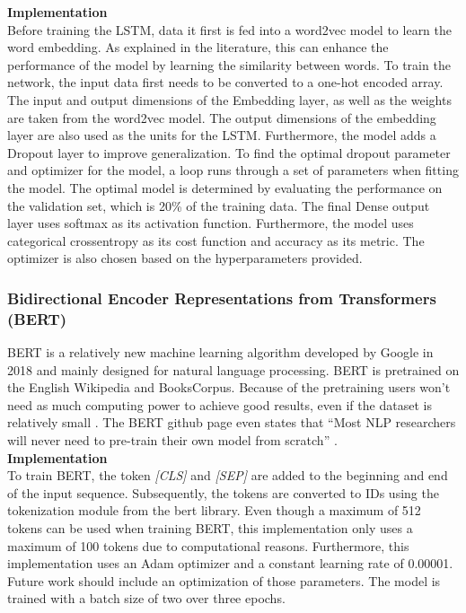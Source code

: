 \documentclass[11pt, a4paper]{article}
\begin{document}
\noindent\textbf{Implementation}\\
Before training the LSTM, data it first is fed into a word2vec model to learn the word embedding. As explained in the literature, this can enhance the performance of the model by learning the similarity between words.
To train the network, the input data first needs to be converted to a one-hot encoded array. The input and output dimensions of the Embedding layer, as well as the weights are taken from the word2vec model.
The output dimensions of the embedding layer are also used as the units for the LSTM. Furthermore, the model adds a Dropout layer to improve generalization. To find the optimal dropout parameter and optimizer for the model,
a loop runs through a set of parameters when fitting the model. The optimal model is determined by evaluating the performance on the validation set, which is 20\% of the training data. 
The final Dense output layer uses softmax as its activation function. Furthermore, the model uses categorical crossentropy as its cost function and accuracy as its metric. The optimizer is also chosen based on the hyperparameters provided.


\subsubsection{Bidirectional Encoder Representations from Transformers (BERT)} \label{subs:bert}
BERT is a relatively new machine learning algorithm developed by Google in 2018 and mainly designed for 
natural language processing. BERT is pretrained on the English Wikipedia and BooksCorpus. Because of the 
pretraining users won’t need as much computing power to achieve good results, even if the dataset is relatively 
small \citep{devlin2019bert}. The BERT github page even states that 
“Most NLP researchers will never need to pre-train their own model from scratch” \citep{googlegithub}.\\

\noindent\textbf{Implementation}\\
To train BERT, the token \emph{[CLS]} and \emph{[SEP]} are added to the beginning and end of the input sequence. Subsequently, the tokens are converted to IDs using the tokenization
module from the bert library. Even though a maximum of 512 tokens can be used when training BERT, this implementation only uses a maximum of 100 tokens due to computational reasons.
Furthermore, this implementation uses an Adam optimizer and a constant learning rate of 0.00001. Future work should include an optimization of those parameters. The model is trained with
a batch size of two over three epochs.
\end{document}
